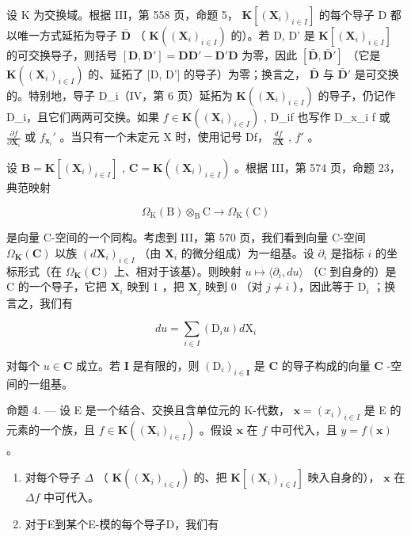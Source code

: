 设 K 为交换域。根据 III，第 558 页，命题 5， \(\mathbf{K}[(\mathbf{X}_i)_{i\in I}]\) 的每个导子 D 都以唯一方式延拓为导子 \(\bar{\mathbf{D}}\) （ \(\mathbf{K}((\mathbf{X}_i)_{i\in I})\) 的）。若 D, D' 是 \(\mathbf{K}[(\mathbf{X}_i)_{i\in I}]\) 的可交换导子，则括号 \([\mathbf{D},\mathbf{D}'] = \mathbf{DD}' - \mathbf{D}'\mathbf{D}\) 为零，因此 \([\bar{\mathbf{D}},\bar{\mathbf{D}}']\) （它是 \(\mathbf{K}((\mathbf{X}_i)_{i\in I})\) 的、延拓了 {[}D, D'{]} 的导子）为零；换言之， \(\bar{\mathbf{D}}\) 与 \(\bar{\mathbf{D}}'\) 是可交换的。特别地，导子 D\_i（IV，第 6 页）延拓为 \(\mathbf{K}((\mathbf{X}_i)_{i\in I})\) 的导子，仍记作 D\_i，且它们两两可交换。如果 \(f\in \mathbf{K}((\mathbf{X}_i)_{i\in I})\) , D\_if 也写作 D\_x\_i f 或 \(\frac{\partial f}{\partial\mathbf{X}_i}\) 或 \(f_{\mathbf{x}_i}'\) 。当只有一个未定元 X 时，使用记号 Df， \(\frac{df}{d\mathbf{X}}\) , \(f'\) 。

设 \(\mathbf{B} = \mathbf{K}[(\mathbf{X}_i)_{i \in I}]\) , \(\mathbf{C} = \mathbf{K}((\mathbf{X}_i)_{i \in I})\) 。根据 III，第 574 页，命题 23，典范映射

\[
\Omega_ {\mathrm{K}} (\mathrm{B}) \otimes_ {\mathrm{B}} \mathrm{C} \rightarrow \Omega_ {\mathrm{K}} (\mathrm{C})
\]

是向量 C-空间的一个同构。考虑到 III，第 570 页，我们看到向量 C-空间 \(\Omega_{\mathbf{K}}(\mathbf{C})\) 以族 \((d\mathbf{X}_i)_{i\in I}\) （由 \(\mathbf{X}_i\) 的微分组成）为一组基。设 \(\partial_i\) 是指标 \(i\) 的坐标形式（在 \(\Omega_{\mathbf{K}}(\mathbf{C})\) 上、相对于该基）。则映射 \(u\mapsto \langle \partial_i,du\rangle\) （C 到自身的）是 C 的一个导子，它把 \(\mathbf{X}_i\) 映到 1 ，把 \(\mathbf{X}_j\) 映到 0 （对 \(j\neq i\) ），因此等于 \(\mathrm{D}_i\) ；换言之，我们有

\[
d u = \sum_ {i \in I} \left(\mathrm{D} _ {i} u\right) d \mathrm{X} _ {i}\tag{1}
\]

对每个 \(u \in \mathbf{C}\) 成立。若 \(\mathbf{I}\) 是有限的，则 \((\mathrm{D}_i)_{i \in \mathbf{I}}\) 是 \(\mathbf{C}\) 的导子构成的向量 \(\mathbf{C}\) -空间的一组基。

命题 4. --- 设 E 是一个结合、交换且含单位元的 K-代数， \(\mathbf{x} = (x_i)_{i \in I}\) 是 E 的元素的一个族，且 \(f \in \mathbf{K}((\mathbf{X}_i)_{i \in I})\) 。假设 \(\mathbf{x}\) 在 \(f\) 中可代入，且 \(y = f(\mathbf{x})\) 。

\begin{enumerate}
\def\labelenumi{(\roman{enumi})}
\item
  对每个导子 \(\Delta\) （ \(\mathbf{K}((\mathbf{X}_i)_{i\in I})\) 的、把 \(\mathbf{K}[(\mathbf{X}_i)_{i\in I}]\) 映入自身的）， \(\mathbf{x}\) 在 \(\Delta f\) 中可代入。
\item
  对于E到某个E-模的每个导子D，我们有
\end{enumerate}

